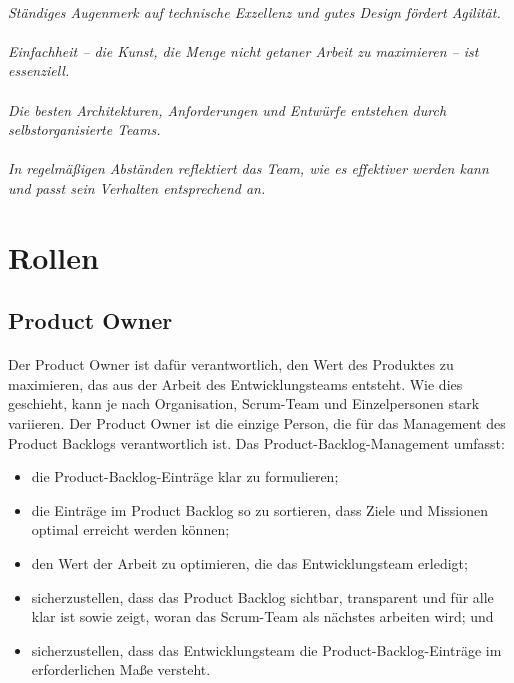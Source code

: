 \documentclass{article}
\begin{document}
{\paragraph{}
\textit{Ständiges Augenmerk auf technische Exzellenz und gutes Design fördert Agilität.}

\paragraph{}
\textit{Einfachheit -- die Kunst, die Menge nicht getaner Arbeit zu maximieren -- ist essenziell.}

\paragraph{}
\textit{Die besten Architekturen, Anforderungen und Entwürfe entstehen durch selbstorganisierte Teams.}

\paragraph{}
\textit{In regelmäßigen Abständen reflektiert das Team, wie es effektiver werden kann und passt sein Verhalten entsprechend an.}

}
\cite{manifesto}

\section{Rollen}
\subsection{Product Owner}
\paragraph{}
Der Product Owner ist dafür verantwortlich, den Wert des Produktes zu maximieren, das aus der Arbeit des Entwicklungsteams entsteht. Wie dies geschieht, kann je nach Organisation, Scrum-Team und Einzelpersonen stark variieren. Der Product Owner ist die einzige Person, die für das Management des Product Backlogs verantwortlich ist. Das Product-Backlog-Management umfasst:
\begin{itemize}
\item{die Product-Backlog-Einträge klar zu formulieren;}
\item{die Einträge im Product Backlog so zu sortieren, dass Ziele und Missionen optimal erreicht werden können;}
\item{den Wert der Arbeit zu optimieren, die das Entwicklungsteam erledigt;}
\item{sicherzustellen, dass das Product Backlog sichtbar, transparent und für alle klar ist sowie zeigt, woran das Scrum-Team als nächstes arbeiten wird; und}
\item{sicherzustellen, dass das Entwicklungsteam die Product-Backlog-Einträge im erforderlichen Maße versteht.}
\end{itemize}
\end{document}
